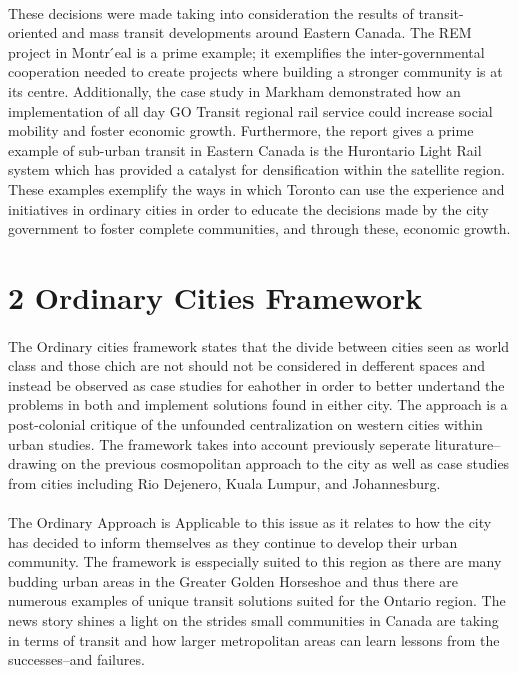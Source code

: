 \documentclass[12pt]{book}
\begin{document}
\paragraph*{}
These decisions were made taking into consideration the results of transit-oriented and mass transit developments around Eastern Canada. The REM project in Montr ́eal is a prime example; it exemplifies the inter-governmental cooperation needed to create projects where building a stronger community is at 
its centre. Additionally, the case study in Markham demonstrated how an implementation of all day GO Transit regional rail service could increase 
social mobility and foster economic growth. Furthermore, the report gives a prime example of sub-urban transit in Eastern Canada is the Hurontario Light Rail 
system which has provided a catalyst for densification within the satellite region. These examples exemplify the ways in which Toronto 
can use the experience and initiatives in ordinary cities in order to educate the decisions made by the city government to foster complete communities, and 
through these, economic growth.\cite{report}


\section*{2 Ordinary Cities Framework} %
\paragraph*{}
The Ordinary cities framework states that the divide between cities seen as world class and those chich are
not should not be considered in defferent spaces and instead be observed as case studies for eahother in order to better undertand
the problems in both and implement solutions found in either city.\cite{ordinary} The approach is a post-colonial critique 
of the unfounded centralization on western cities within urban studies. The framework takes into account previously seperate liturature--drawing 
on the previous cosmopolitan approach to the city as well as case studies from cities including Rio Dejenero, Kuala Lumpur, and Johannesburg.
\cite{ordinary}

\paragraph*{}
The Ordinary Approach is Applicable to this issue as it relates to how the city has decided to inform themselves as they continue to
develop their urban community. The framework is esspecially suited to this region as there are many budding urban areas in the Greater
Golden Horseshoe and thus there are numerous examples of unique transit solutions suited for the Ontario region\cite{report}. The news story shines 
a light on the strides small communities in Canada are taking in terms of transit and how larger metropolitan areas can learn lessons 
from the successes--and failures.
\end{document}
